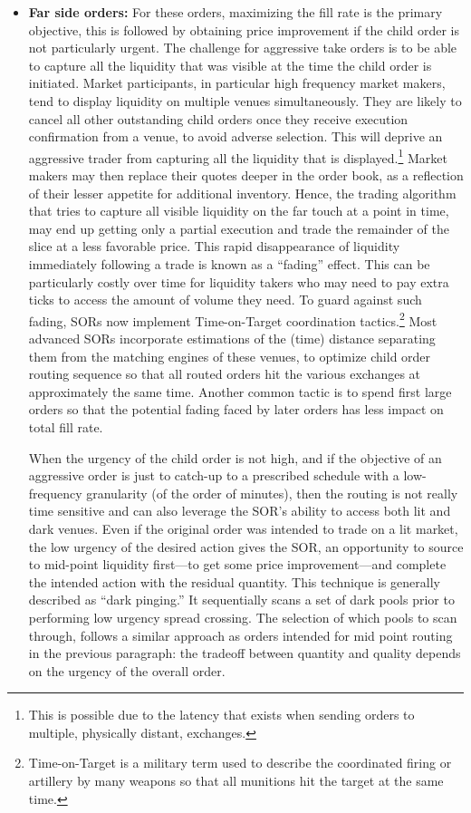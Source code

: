 \begin{itemize}
\item \textbf{Far side orders:} For these orders, maximizing the fill rate is the primary objective, this is followed by obtaining price improvement if the child order is not particularly urgent. The challenge for aggressive take orders is to be able to capture all the liquidity that was visible at the time the child order is initiated. Market participants, in particular high frequency market makers, tend to display liquidity on multiple venues simultaneously. They are likely to cancel all other outstanding child orders once they receive execution confirmation from a venue, to avoid adverse selection. This will deprive an aggressive trader from capturing all the liquidity that is displayed.\footnote{This is possible due to the latency that exists when sending orders to multiple, physically distant, exchanges.} Market makers may then replace their quotes deeper in the order book, as a reflection of their lesser appetite for additional inventory. Hence, the trading algorithm that tries to capture all visible liquidity on the far touch at a point in time, may end up getting only a partial execution and trade the remainder of the slice at a less favorable price. This rapid disappearance of liquidity immediately following a trade is known as a ``fading'' effect. This can be particularly costly over time for liquidity takers who may need to pay extra ticks to access the amount of volume they need. To guard against such fading, SORs now implement Time-on-Target coordination tactics.\footnote{Time-on-Target is a military term used to describe the coordinated firing or artillery by many weapons so that all munitions hit the target at the same time.} Most advanced SORs incorporate estimations of the (time) distance separating them from the matching engines of these venues, to optimize child order routing sequence so that all routed orders hit the various exchanges at approximately the same time. Another common tactic is to spend first large orders so that the potential fading faced by later orders has less impact on total fill rate. 

When the urgency of the child order is not high, and if the objective of an aggressive order is just to catch-up to a prescribed schedule with a low-frequency granularity (of the order of minutes), then the routing is not really time sensitive and can also leverage the SOR's ability to access both lit and dark venues. Even if the original order was intended to trade on a lit market, the low urgency of the desired action gives the SOR, an opportunity to source to mid-point liquidity first---to get some price improvement---and complete the intended action with the residual quantity. This technique is generally described as ``dark pinging.'' It sequentially scans a set of dark pools prior to performing low urgency spread crossing. The selection of which pools to scan through, follows a similar approach as orders intended for mid point routing in the previous paragraph: the tradeoff between quantity and quality depends on the urgency of the overall order.
\end{itemize}


